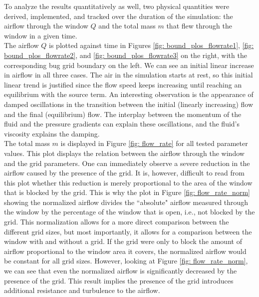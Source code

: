 To analyze the results quantitatively as well, two physical quantities were derived, implemented, and tracked over the duration of the simulation: the airflow through the window $Q$ and the total mass $m$ that flew through the window in a given time. \\
The airflow $Q$ is plotted against time in Figures \ref{fig: bound_plos_flowrate1}, \ref{fig: bound_plos_flowrate2}, and \ref{fig: bound_plos_flowrate3} on the right, with the corresponding bug grid boundary on the left. We can see an initial linear increase in airflow in all three cases. The air in the simulation starts at rest, so this initial linear trend is justified since the flow speed keeps increasing until reaching an equilibrium with the source term. An interesting observation is the appearance of damped oscillations in the transition between the initial (linearly increasing) flow and the final (equilibrium) flow. The interplay between the momentum of the fluid and the pressure gradients can explain these oscillations, and the fluid's viscosity explains the damping. \\
The total mass $m$ is displayed in Figure \ref{fig: flow_rate} for all tested parameter values.
This plot displays the relation between the airflow through the window and the grid parameters. One can immediately observe a severe reduction in the airflow caused by the presence of the grid. It is, however, difficult to read from this plot whether this reduction is merely proportional to the area of the window that is blocked by the grid. 
This is why the plot in Figure \ref{fig: flow_rate_norm} showing the normalized airflow divides the ``absolute" airflow measured through the window by the percentage of the window that is open, i.e., not blocked by the grid. This normalization allows for a more direct comparison between the different grid sizes, but most importantly, it allows for a comparison between the window with and without a grid. If the grid were only to block the amount of airflow proportional to the window area it covers, the normalized airflow would be constant for all grid sizes. However, looking at Figure \ref{fig: flow_rate_norm}, we can see that even the normalized airflow is significantly decreased by the presence of the grid. This result implies the presence of the grid introduces additional resistance and turbulence to the airflow.\\



